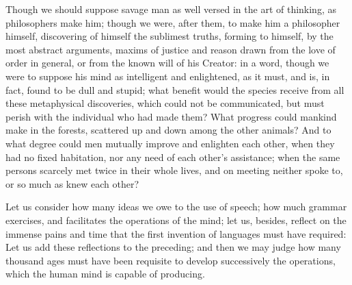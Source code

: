 \documentclass[11pt,twocolumn]{ltugboat}
\begin{document}
Though we should suppose savage man as well versed in the art of
thinking, as philosophers make him; though we were, after them, to
make him a philosopher himself, discovering of himself the sublimest
truths, forming to himself, by the most abstract arguments, maxims of
justice and reason drawn from the love of order in general, or from
the known will of his Creator: in a word, though we were to suppose
his mind as intelligent and enlightened, as it must, and is, in fact,
found to be dull and stupid; what benefit would the species receive
from all these metaphysical discoveries, which could not be
communicated, but must perish with the individual who had made them?
What progress could mankind make in the forests, scattered up and down
among the other animals? And to what degree could men mutually improve
and enlighten each other, when they had no fixed habitation, nor any
need of each other's assistance; when the same persons scarcely met
twice in their whole lives, and on meeting neither spoke to, or so
much as knew each other?

Let us consider how many ideas we owe to the use of speech; how much
grammar exercises, and facilitates the operations of the mind; let us,
besides, reflect on the immense pains and time that the first
invention of languages must have required: Let us add these
reflections to the preceding; and then we may judge how many thousand
ages must have been requisite to develop successively the operations,
which the human mind is capable of producing.
\end{document}
